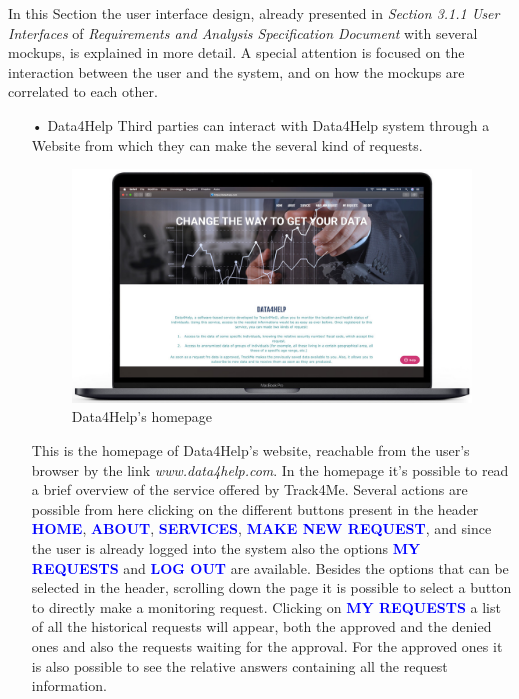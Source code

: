 \noindent
In this Section the user interface design, already presented in  \textit{Section 3.1.1 User Interfaces} of \textit{Requirements and Analysis Specification Document} with several mockups, is explained in more detail. A special attention is focused on the interaction between the user and the system, and on how the mockups are correlated to each other.
\bigbreak
\noindent
\begin{enumerate}
\item[•]{\Large Data4Help}
\bigbreak
\noindent
Third parties can interact with Data4Help system through a Website from which they can make the several kind of requests.
\begin{figure}[H]
        \centering
          \includegraphics[scale = 0.33]{Images/Mockups/Homepage.jpg}
          	\caption{Data4Help's homepage}
\end{figure}
This is the homepage of Data4Help's website, reachable from the user's browser by the link \textit{www.data4help.com}. In the homepage it's possible to read a brief overview of the service offered by Track4Me. Several actions are possible from here clicking on the different buttons present in the header {\textcolor{Blue}{\textbf{HOME}}}, {\textcolor{Blue}{\textbf{ABOUT}}}, {\textcolor{Blue}{\textbf{SERVICES}}}, {\textcolor{Blue}{\textbf{MAKE NEW REQUEST}}}, and since the user is already logged into the system also the options {\textcolor{Blue}{\textbf{MY REQUESTS}}} and {\textcolor{Blue}{\textbf{LOG OUT}}} are available. Besides the options that can be selected in the header, scrolling down the page it is possible to select a button to directly make a monitoring request. 
\bigbreak
\noindent
Clicking on {\textcolor{Blue}{\textbf{MY REQUESTS}}} a list of all the historical requests will appear, both the approved and the denied ones and also the requests waiting for the approval. For the approved ones it is also possible to see the relative answers containing all the request information.
\clearpage


\end{enumerate}
